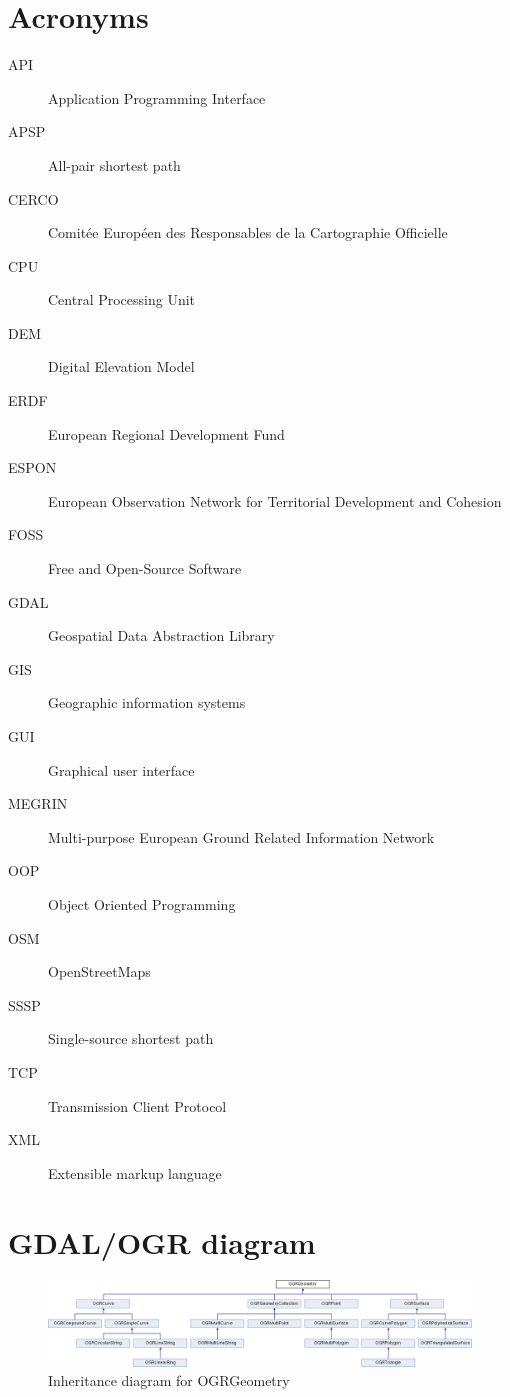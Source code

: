 \documentclass[thesis=M,english]{FITthesis}[2012/10/20]
\begin{document}



\appendix

\chapter{Acronyms}
\begin{description}
	\item[API] Application Programming Interface
	\item[APSP] All-pair shortest path
	\item[CERCO] Comit{\' e}e Europ{\' e}en des Responsables de la Cartographie Officielle
	\item[CPU] Central Processing Unit
	\item[DEM] Digital Elevation Model
	\item[ERDF] European Regional Development Fund
	\item[ESPON] European Observation Network for Territorial Development and Cohesion
	\item[FOSS] Free and Open-Source Software
	\item[GDAL] Geospatial Data Abstraction Library
	\item[GIS] Geographic information systems	
	\item[GUI] Graphical user interface
	\item[MEGRIN] Multi-purpose European Ground Related Information Network
	\item[OOP] Object Oriented Programming
	\item[OSM] OpenStreetMaps
	\item[SSSP] Single-source shortest path
	\item[TCP] Transmission Client Protocol
	\item[XML] Extensible markup language
	
	
\end{description}

\chapter{GDAL/OGR diagram}


\begin{figure}[H]
\centering
\includegraphics[width=1\textwidth]{pics/classOGRGeometry}
\caption{Inheritance diagram for OGRGeometry}
\label{pic:OGRGeo}
\end{figure}
\end{document}
